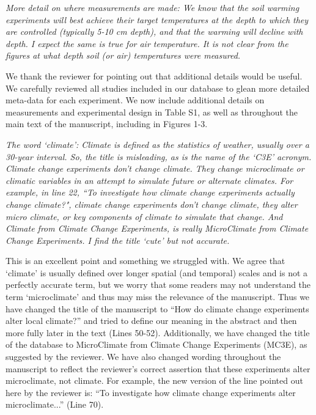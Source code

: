 \documentclass[11pt,a4paper]{letter}
\begin{document}
\begin{letter}{}
\par \emph{More detail on where measurements are made:  We know that the soil warming experiments will best achieve their target temperatures at the depth to which they are controlled (typically 5-10 cm depth), and that the warming will decline with depth.  I expect the same is true for air temperature. It is not clear from the figures at what depth soil (or air) temperatures were measured.}
\par We thank the reviewer for pointing out that additional details would be useful. We carefully reviewed all studies included in our database to glean more detailed meta-data for each experiment. We now include additional details on measurements and experimental design in Table S1, as well as throughout the main text of the manuscript, including in Figures 1-3.

\par \emph{The word `climate': Climate is defined as the statistics of weather, usually over a 30-year interval. So, the title is misleading, as is the name of the `C3E' acronym.  Climate change experiments don't change climate.  They change microclimate or climatic variables in an attempt to simulate future or alternate climates.  For example, in line 22, ``To investigate how climate change experiments actually change climate?", climate change experiments don't change climate, they alter micro climate, or key components of climate to simulate that change.  And Climate from Climate Change Experiments, is really MicroClimate from Climate Change Experiments. I find the title `cute' but not accurate.}

\par This is an excellent point and something we struggled with. We agree that `climate' is usually defined over longer spatial (and temporal) scales and is not a perfectly accurate term, but we worry that some readers may not understand the term `microclimate' and thus may miss the relevance of the manuscript. Thus we have changed the title of the manuscript to ``How do climate change experiments alter local climate?'' and tried to define our meaning in the abstract and then more fully later in the text (Lines 50-52). Additionally, we have changed the title of the database to MicroClimate from Climate Change Experiments (MC3E), as suggested by the reviewer. We have also changed wording throughout the manuscript to reflect the reviewer's correct assertion that these experiments alter microclimate, not climate. For example, the new version of the line pointed out here by the reviewer is: ``To investigate how climate change experiments alter microclimate...'' (Line 70).


\end{letter}
\end{document}
